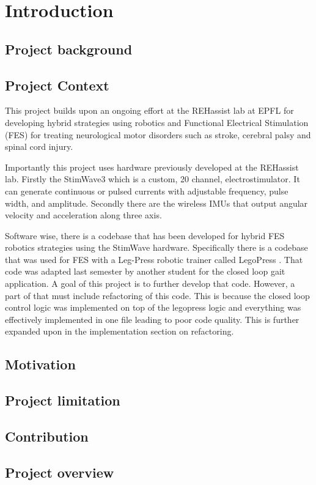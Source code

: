 
\section{Introduction }


\subsection{Project background}

\subsection{Project Context}
This project builds upon an ongoing effort at the REHassist lab at EPFL for developing hybrid strategies using robotics and Functional Electrical Stimulation (FES) for treating neurological motor disorders such as stroke, cerebral palsy and spinal cord injury. 

Importantly this project uses hardware previously developed at the REHassist lab. Firstly the StimWave3 which is a custom, 20 channel, electrostimulator. It can generate continuous or pulsed currents with adjustable frequency, pulse width, and amplitude. Secondly there are the wireless IMUs that output angular velocity and acceleration along three axis. 

Software wise, there is a codebase that has been developed for hybrid FES robotics strategies using the StimWave hardware. Specifically there is a codebase that was used for FES with a Leg-Press robotic trainer called LegoPress \cite{olivier_legopress_2014}. That code was adapted last semester by another student for the closed loop gait application. A goal of this project is to further develop that code. However, a part of that must include refactoring of this code. This is because the closed loop control logic was implemented on top of the legopress logic and everything was effectively implemented in one file leading to poor code quality. This is further expanded upon in the implementation section on refactoring.




\subsection{Motivation}

\subsection{Project limitation}

\subsection{Contribution}

\subsection{Project overview}



